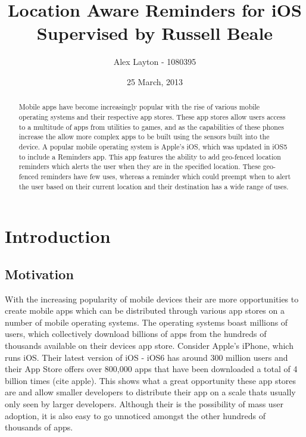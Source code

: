 \documentclass[12pt]{report}
\title{Location Aware Reminders for iOS\\ \small{Supervised by Russell Beale}}
\author{Alex Layton - 1080395}
\date{25 March, 2013}
\begin{document}
\maketitle

\begin{abstract}

Mobile apps have become increasingly popular with the rise of various mobile operating systems and their respective app stores. These app stores allow users access to a multitude of apps from utilities to games, and as the capabilities of these phones increase the allow more complex apps to be built using the sensors built into the device. A popular mobile operating system is Apple's iOS, which was updated in iOS5 to include a Reminders app. This app features the ability to add geo-fenced location reminders which alerts the user when they are in the specified location. These geo-fenced reminders have few uses, whereas a reminder which could preempt when to alert the user based on their current location and their destination has a wide range of uses.

\end{abstract}

\tableofcontents
\newpage

\section{Introduction}

\subsection{Motivation}

With the increasing popularity of mobile devices their are more opportunities to create mobile apps which can be distributed through various app stores on a number of mobile operating systems. The operating systems boast millions of users, which collectively download billions of apps from the hundreds of thousands available on their devices app store. Consider Apple's iPhone, which runs iOS. Their latest version of iOS - iOS6 has around 300 million users and their App Store offers over 800,000 apps that have been downloaded a total of 4 billion times (cite apple). This shows what a great opportunity these app stores are and allow smaller developers to distribute their app on a scale thats usually only seen by larger developers. Although their is the possibility of mass user adoption, it is also easy to go unnoticed amongst the other hundreds of thousands of apps.
\end{document}
